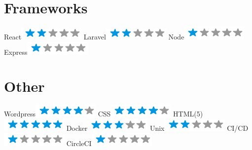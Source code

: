 \begin{aside}
    \section{Frameworks}
      React\includegraphics[scale=0.40]{img/2stars.png}
      Laravel\includegraphics[scale=0.40]{img/2stars.png}
      Node\includegraphics[scale=0.40]{img/1stars.png}
      Express\includegraphics[scale=0.40]{img/1stars.png}
    \section{Other}
      Wordpress\includegraphics[scale=0.40]{img/4stars.png}
      CSS\includegraphics[scale=0.40]{img/4stars.png}
      HTML(5)\includegraphics[scale=0.40]{img/5stars.png}
      Docker\includegraphics[scale=0.40]{img/3stars.png}
      Unix\includegraphics[scale=0.40]{img/2stars.png}
      CI/CD\includegraphics[scale=0.40]{img/1stars.png}
      CircleCI\includegraphics[scale=0.40]{img/1stars.png}
  \end{aside}
